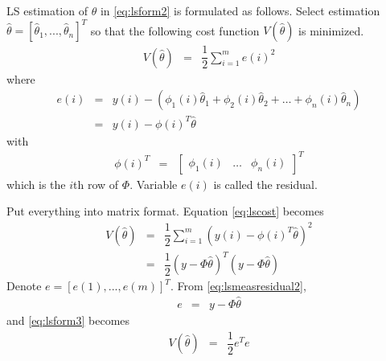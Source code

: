 LS estimation of $\theta$ in \eqref{eq:lsform2} is formulated as follows. Select estimation $\hat{\theta} = [\hat{\theta}_1, ..., \hat{\theta}_n]^T$ so that the following cost function $V(\hat{\theta})$ is minimized.
\begin{eqnarray}
  V(\hat{\theta}) &=& \dfrac{1}{2}\sum_{i=1}^{m}e(i)^2 \label{eq:lscost}
\end{eqnarray}
where
\begin{eqnarray}
  e(i) &=& y(i) - \left(\phi_1(i)\hat{\theta}_1 + \phi_2(i)\hat{\theta}_2 + \ldots + \phi_n(i)\hat{\theta}_n\right) \nonumber \\
  &=& y(i) - \phi(i)^T\hat{\theta} \label{eq:lsmeasresidual2}
\end{eqnarray}
with
\begin{eqnarray}
  \phi(i)^T &=& \left[\begin{array}{ccc}
                        \phi_1(i) & \ldots & \phi_n(i)
                      \end{array}\right]^T \nonumber
\end{eqnarray}
which is the $i$th row of $\Phi$. Variable $e(i)$ is called the residual.

Put everything into matrix format. Equation \eqref{eq:lscost} becomes
\begin{eqnarray}
	V(\hat{\theta}) &=& \dfrac{1}{2}\sum_{i=1}^{m} \left(y(i) - \phi(i)^T\hat{\theta}\right)^2 \nonumber \\
	&=& \dfrac{1}{2}(y - \Phi\hat{\theta})^T(y - \Phi\hat{\theta}) \label{eq:lsform3}
\end{eqnarray}
Denote $e = [e(1), ..., e(m)]^T$. From \eqref{eq:lsmeasresidual2},
\begin{eqnarray}
  e &=& y - \Phi\hat{\theta} \label{eq:lsmeasresidual1}
\end{eqnarray}
and \eqref{eq:lsform3} becomes
\begin{eqnarray}
	V(\hat{\theta}) &=& \dfrac{1}{2}e^Te \label{eq:lsform4}
\end{eqnarray}

